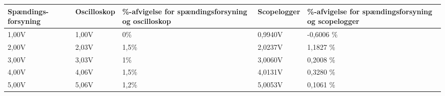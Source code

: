 \begin{center}
\label{USBisolatortest}
    \begin{tabular}{ | p{2cm} | p{2cm} | p{3.5cm} | p{2.1cm} | p{3.5cm} |}
    \hline
    \textbf{Spændings- forsyning} 	&  \textbf{Oscilloskop} 	& \textbf{\%-afvigelse for spændingsforsyning og oscilloskop}	& \textbf{Scopelogger}	&\textbf{\%-afvigelse for spændingsforsyning og scopelogger} \\ \hline
    1,00V             				& 1,00V    				& 0\% 		    	& 0,9940V       &  -0,6006 \%  \\ \hline
    2,00V                          	& 2,03V					& 1,5\%			& 2,0237V       &   1,1827 \%  \\ \hline
    3,00V                         	& 3,03V					& 1\%	    		& 3,0060V       &   0,2008 \%   \\ \hline
    4,00V                          	& 4,06V					& 1,5\%			& 4,0131V       &   0,3280 \%   \\ \hline
    5,00V                          	& 5,06V					& 1,2\% 		& 5,0053V       &   0,1061 \%  \\ \hline
    \end{tabular}
\end{center}

